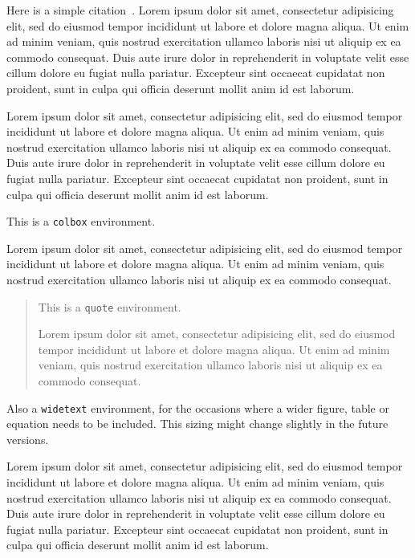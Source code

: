 \documentclass[11pt]{salam}
\begin{document}
Here is a simple citation~\cite{latexcompanion}. Lorem ipsum dolor sit amet, consectetur adipisicing elit, sed do eiusmod tempor incididunt ut labore et dolore magna aliqua. Ut enim ad minim veniam, quis nostrud exercitation ullamco laboris nisi ut aliquip ex ea commodo consequat. Duis aute irure dolor in reprehenderit in voluptate velit esse cillum dolore eu fugiat nulla pariatur. Excepteur sint occaecat cupidatat non proident, sunt in culpa qui officia deserunt mollit anim id est laborum.

Lorem ipsum dolor sit amet, consectetur adipisicing elit, sed do eiusmod tempor incididunt ut labore et dolore magna aliqua. Ut enim ad minim veniam, quis nostrud exercitation ullamco laboris nisi ut aliquip ex ea commodo consequat. Duis aute irure dolor in reprehenderit in voluptate velit esse cillum dolore eu fugiat nulla pariatur. Excepteur sint occaecat cupidatat non proident, sunt in culpa qui officia deserunt mollit anim id est laborum.

\begin{colbox}
  This is a \texttt{colbox} environment.

  Lorem ipsum dolor sit amet, consectetur adipisicing elit, sed do eiusmod tempor incididunt ut labore et dolore magna aliqua. Ut enim ad minim veniam, quis nostrud exercitation ullamco laboris nisi ut aliquip ex ea commodo consequat.
\end{colbox}

\begin{quote}
  This is a \texttt{quote} environment.
  
  Lorem ipsum dolor sit amet, consectetur adipisicing elit, sed do eiusmod tempor incididunt ut labore et dolore magna aliqua. Ut enim ad minim veniam, quis nostrud exercitation ullamco laboris nisi ut aliquip ex ea commodo consequat.
\end{quote}

Also a \texttt{widetext} environment, for the occasions where a wider figure, table or equation needs to be included. This sizing might change slightly in the future versions.
\begin{widetext}
  Lorem ipsum dolor sit amet, consectetur adipisicing elit, sed do eiusmod tempor incididunt ut labore et dolore magna aliqua. Ut enim ad minim veniam, quis nostrud exercitation ullamco laboris nisi ut aliquip ex ea commodo consequat. Duis aute irure dolor in reprehenderit in voluptate velit esse cillum dolore eu fugiat nulla pariatur. Excepteur sint occaecat cupidatat non proident, sunt in culpa qui officia deserunt mollit anim id est laborum.
\end{widetext}
\end{document}
